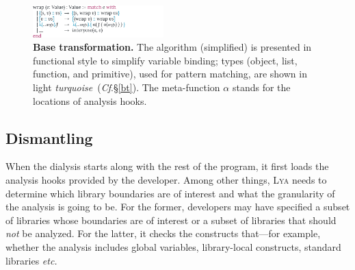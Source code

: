 \documentclass[letterpaper,twocolumn,10pt]{article}
\def\etc{{\em etc.}\xspace}
\newcommand{\ttt}[1]{\texttt{#1}}
\newcommand{\cf}[1]{(\emph{Cf}.\S\ref{#1})}
\newcommand{\sx}[1]{(\S\ref{#1})}
\newcommand{\sys}{{\scshape Lya}\xspace}
\newcommand{\pc}{PIC\xspace}
\begin{document}

\begin{figure}[t]
\raggedleft 
\includegraphics[width=0.45\textwidth]{./figs/lya_base.pdf}
\caption{
  \textbf{Base transformation.}
  \textmd{
  The algorithm (simplified) is presented in functional style to simplify variable binding; types (object, list, function, and primitive), used for pattern matching, are shown in light {\color{cdb} \emph{turquoise}}~\cf{bt}. The meta-function $\alpha$ stands for the locations of analysis hooks.
  }
}
\label{fig:base}
\end{figure}


\subsection{Dismantling}
\label{one}

When the dialysis starts along with the rest of the program, it first loads the analysis hooks provided by the developer. 
Among other things, \sys needs to determine which library boundaries are of interest and what the granularity of the analysis is going to be.
For the former, developers may have specified a subset of libraries whose boundaries are of interest or a subset of libraries that should \emph{not} be analyzed.
For the latter, it checks the constructs that---for example, whether the analysis includes global variables, library-local constructs, standard libraries \etc
\end{document}
